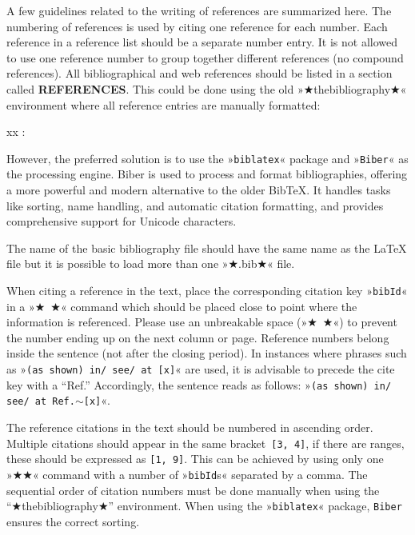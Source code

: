 \documentclass[%
               hyphens,       %
               ]{jacow}
\begin{document}
A few guidelines related to the writing of references are summarized here.
The numbering of references is used by citing one reference for each number. 
Each reference in a  reference list should be a separate number entry. 
It is not allowed to use one reference number to group together different references (no compound references).
All bibliographical and web references should be listed in a section called \textbf{REFERENCES}. 
This could be done using the old »★thebibliography★« environment where all reference entries are
manually formatted:
\begin{Tverb}
\begin{thebibliography}{xx} %
   :
\end{thebibliography}
\end{Tverb}

However, the preferred solution is to use the »\texttt{biblatex}« package and »\texttt{Biber}« as the processing engine.
Biber is used to process and format bibliographies, offering a more powerful and modern alternative to the older Bib\TeX. 
It handles tasks like sorting, name handling, and automatic citation formatting, 
and provides comprehensive support for Unicode characters.
The name of the basic bibliography file should have the same name as the {\LaTeX} file 
but it is possible to load more than one »★.bib★« file.

When citing a reference in the text, place the corresponding citation key   »\texttt{bibId}« in a
»★~\cite{}★« command which should be placed close to point where the information is referenced.
Please use an unbreakable space (»★~★«) to prevent the number ending up on the next column or page. 
Reference numbers belong inside the sentence (not after the closing period). 
In instances where phrases such as  »\texttt{(as shown) in/ see/ at [x]}« are used, it is advisable to precede the cite key with a “Ref.” Accordingly, the sentence reads as follows: »\texttt{(as shown) in/ see/ at  Ref.$\sim$[x]}«.

The reference citations in the text should be numbered in ascending order. 
Multiple citations should appear in the same bracket~\texttt{[3, 4]}, 
if there are ranges, these should be expressed as \texttt{[1­­, 9]}. 
This can be achieved by using only one »★\cite{}★« command with a number of
»\texttt{bibId}s« separated by a comma. 
The sequential order of citation numbers must be done manually 
when using the “★thebibliography★” environment. 
When using the »\texttt{biblatex}« package, \texttt{Biber} ensures the correct sorting.
\end{document}
